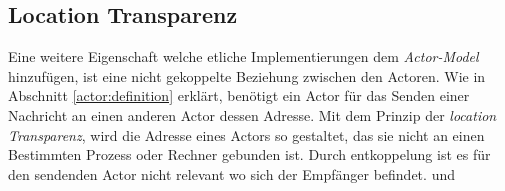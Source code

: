 \subsection{Location Transparenz}\label{actor:locationTransparency}
Eine weitere Eigenschaft welche etliche Implementierungen dem \textit{Actor-Model} hinzufügen, ist eine nicht gekoppelte Beziehung zwischen den Actoren. Wie in Abschnitt \ref{actor:definition} erklärt, benötigt ein Actor für das Senden einer Nachricht an einen anderen Actor dessen Adresse. Mit dem Prinzip der \textit{location Transparenz}, wird die Adresse eines Actors so gestaltet, das sie nicht an einen Bestimmten Prozess oder Rechner gebunden ist. Durch entkoppelung ist es für den sendenden Actor nicht relevant wo sich der Empfänger befindet. \citep{Vernon2015ReactiveAkka} und \citep{sargent2016play}

